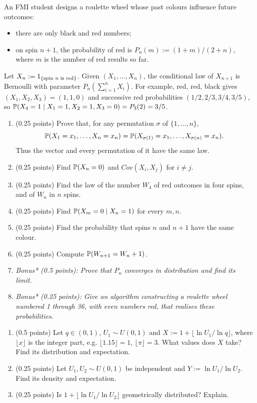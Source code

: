 \documentclass[a4paper]{report}
\begin{document}
\begin{problempencil}
An FMI student designs a roulette wheel whose past colours influence future outcomes:
\begin{itemize}
\item there are only black and red numbers;
\item on spin $n+1$, the probability of red is $P_n(m):=(1+m)/(2+n)$, where $m$ is the number of red results so far.
\end{itemize}
Let $X_n:=\ind{\{\text{spin }n\text{ is red}\}}$. Given $(X_1,\dots,X_n)$, the conditional law of $X_{n+1}$ is Bernoulli with parameter $P_n(\sum_{i=1}^nX_i)$. For example, red, red, black gives $(X_1,X_2,X_3)=(1,1,0)$ and successive red probabilities $(1/2,2/3,3/4,3/5)$, so $\P(X_4=1\mid X_1=1,X_2=1,X_3=0)=P_3(2)=3/5$.
\begin{enumerate}
\item (0.25 points) Prove that, for any permutation $\sigma$ of $\{1,\dots,n\}$,
\[\P(X_1=x_1,\dots,X_n=x_n)=\P(X_{\sigma(1)}=x_1,\dots,X_{\sigma(n)}=x_n).\]
Thus the vector and every permutation of it have the same law.
\item (0.25 points) Find $\P(X_n=0)$ and $Cov(X_i,X_j)$ for $i\ne j$.
\item (0.25 points) Find the law of the number $W_4$ of red outcomes in four spins, and of $W_n$ in $n$ spins.
\item (0.25 points) Find $\P(X_m=0\mid X_n=1)$ for every $m,n$.
\item (0.25 points) Find the probability that spins $n$ and $n+1$ have the same colour.
\item (0.25 points) Compute $\P(W_{n+1}=W_n+1)$.
\item \textit{Bonus* (0.5 points): Prove that $P_n$ converges in distribution and find its limit.}
\item \textit{Bonus* (0.25 points): Give an algorithm constructing a roulette wheel numbered 1 through 36, with even numbers red, that realises these probabilities.}
\end{enumerate}
\end{problempencil}
\begin{problempencil}
\begin{enumerate}
\item (0.5 points) Let $q\in(0,1)$, $U_1\sim U(0,1)$ and $X:=1+\lfloor\ln U_1/\ln q\rfloor$, where $\lfloor x\rfloor$ is the integer part, e.g. $\lfloor1.15\rfloor=1$, $\lfloor\pi\rfloor=3$. What values does $X$ take? Find its distribution and expectation.
\item (0.25 points) Let $U_1,U_2\sim U(0,1)$ be independent and $Y:=\ln U_1/\ln U_2$. Find its density and expectation.
\item (0.25 points) Is $1+\lfloor\ln U_1/\ln U_2\rfloor$ geometrically distributed? Explain.
\end{enumerate}
\end{problempencil}
\end{document}
